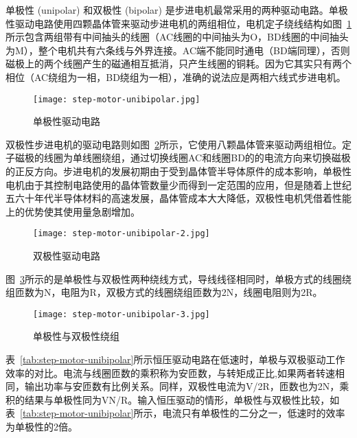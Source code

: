 单极性 (unipolar) 和双极性 (bipolar) 是步进电机最常采用的两种驱动电路。单极性驱动电路使用四颗晶体管来驱动步进电机的两组相位，电机定子绕线结构如图~\ref{fig:step-motor-unibipolar}所示包含两组带有中间抽头的线圈（AC线圈的中间抽头为O，BD线圈的中间抽头为M），整个电机共有六条线与外界连接。AC端不能同时通电（BD端同理），否则磁极上的两个线圈产生的磁通相互抵消，只产生线圈的铜耗。因为它其实只有两个相位（AC绕组为一相，BD绕组为一相），准确的说法应是两相六线式步进电机。

\begin{figure}[htbp]
    \centering
    \texttt{[image: step-motor-unibipolar.jpg]}
    \caption{单极性驱动电路}
    \label{fig:step-motor-unibipolar}
\end{figure}

双极性步进电机的驱动电路则如图~\ref{fig:step-motor-unibipolar-2}所示，它使用八颗晶体管来驱动两组相位。定子磁极的线圈为单线圈绕组，通过切换线圈AC和线圈BD的的电流方向来切换磁极的正反方向。步进电机的发展初期由于受到晶体管半导体原件的成本影响，单极性电机由于其控制电路使用的晶体管数量少而得到一定范围的应用，但是随着上世纪五六十年代半导体材料的高速发展，晶体管成本大大降低，双极性电机凭借着性能上的优势使其使用量急剧增加。

\begin{figure}[htbp]
    \centering
    \texttt{[image: step-motor-unibipolar-2.jpg]}
    \caption{双极性驱动电路}
    \label{fig:step-motor-unibipolar-2}
\end{figure}

图~\ref{fig:step-motor-unibipolar-3}所示的是单极性与双极性两种绕线方式，导线线径相同时，单极方式的线圈绕组匝数为N，电阻为R，双极方式的线圈绕组匝数为2N，线圈电阻则为2R。

\begin{figure}[htbp]
    \centering
    \texttt{[image: step-motor-unibipolar-3.jpg]}
    \caption{单极性与双极性绕组}
    \label{fig:step-motor-unibipolar-3}
\end{figure}

表~\ref{tab:step-motor-unibipolar}所示恒压驱动电路在低速时，单极与双极驱动工作效率的对比。电流与线圈匝数的乘积称为安匝数，与转矩成正比,如果两者转速相同，输出功率与安匝数有比例关系。同样，双极性电流为V/2R，匝数也为2N，乘积的结果与单极性同为VN/R。输入恒压驱动的情形，单极性与双极性比较，如表~\ref{tab:step-motor-unibipolar}所示，电流只有单极性的二分之一，低速时的效率为单极性的2倍。

